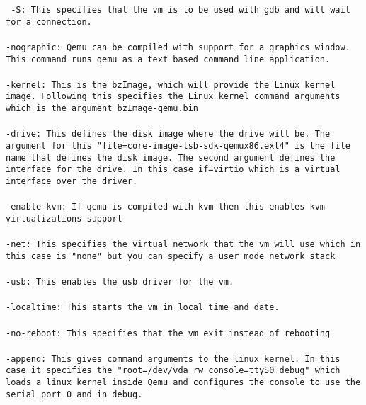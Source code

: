 \documentclass[letterpaper,10pt,titlepage]{article}
\begin{document}
\begin{enumerate}
\texttt{
	-S: This specifies that the vm is to be used with gdb and will wait for a connection.\\
	\\
	-nographic: Qemu can be compiled with support for a graphics window. This command runs qemu as a text based command line application.\\
	\\
	-kernel: This is the bzImage, which will provide the Linux kernel image. Following this specifies the Linux kernel command arguments which is the argument bzImage-qemu.bin\\
	\\
	-drive: This defines the disk image where the drive will be. The argument for this "file=core-image-lsb-sdk-qemux86.ext4" is the file name that defines the disk image. The second argument defines the interface for the drive. In this case if=virtio which is a virtual interface over the driver.\\
	\\
	-enable-kvm: If qemu is compiled with kvm then this enables kvm virtualizations support\\
	\\
	-net: This specifies the virtual network that the vm will use which in this case is "none" but you can specify a user mode network stack\\
	\\
	-usb: This enables the usb driver for the vm.\\
	\\
	-localtime: This starts the vm in local time and date.\\
	\\
	-no-reboot: This specifies that the vm exit instead of rebooting\\
	\\
	-append: This gives command arguments to the linux kernel. In this case it specifies the "root=/dev/vda rw console=ttyS0 debug" which loads a linux kernel inside Qemu and configures the console to use the serial port 0 and in debug.\\
}

\end{enumerate}
\end{document}
